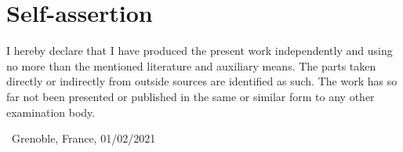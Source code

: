 \chapter*{Self-assertion}
\label{sec:declaration}
\thispagestyle{empty}
\vspace*{\fill}
\noindent
I hereby declare that I have produced the present work independently and using no more than the mentioned literature and auxiliary means. The parts taken directly or indirectly from outside sources are identified as such. The work has so far not been presented or published in the same or similar form to any other examination body.

\smallskip


\noindent\ {Grenoble, France, 01/02/2021}

\smallskip

\begin{flushright}
	\begin{minipage}{5cm}
		\centering\thesisName
	\end{minipage}
\end{flushright}
\vspace*{\fill}


